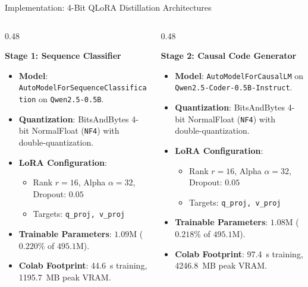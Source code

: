 \documentclass[aspectratio=169,10pt]{beamer}
\begin{document}
\begin{frame}{Implementation: 4-Bit QLoRA Distillation Architectures}
  \begin{columns}[T]
    \begin{column}{0.48\textwidth}
      \begin{block}{\textbf{Stage 1: Sequence Classifier}}
        \begin{itemize}\itemsep=1.5pt\scriptsize
          \item \textbf{Model}: \texttt{AutoModelForSequenceClassification} on \texttt{Qwen2.5-0.5B}.
          \item \textbf{Quantization}: BitsAndBytes 4-bit NormalFloat (\texttt{NF4}) with double-quantization.
          \item \textbf{LoRA Configuration}:
            \begin{itemize}\scriptsize
              \item Rank $r = 16$, Alpha $\alpha = 32$, Dropout: $0.05$
              \item Targets: \texttt{q\_proj, v\_proj}
            \end{itemize}
          \item \textbf{Trainable Parameters}: $1.09\text{M}$ ($0.220\%$ of $495.1\text{M}$).
          \item \textbf{Colab Footprint}: 44.6~s training, 1195.7~MB peak VRAM.
        \end{itemize}
      \end{block}
    \end{column}

    \begin{column}{0.48\textwidth}
      \begin{exampleblock}{\textbf{Stage 2: Causal Code Generator}}
        \begin{itemize}\itemsep=1.5pt\scriptsize
          \item \textbf{Model}: \texttt{AutoModelForCausalLM} on \texttt{Qwen2.5-Coder-0.5B-Instruct}.
          \item \textbf{Quantization}: BitsAndBytes 4-bit NormalFloat (\texttt{NF4}) with double-quantization.
          \item \textbf{LoRA Configuration}:
            \begin{itemize}\scriptsize
              \item Rank $r = 16$, Alpha $\alpha = 32$, Dropout: $0.05$
              \item Targets: \texttt{q\_proj, v\_proj}
            \end{itemize}
          \item \textbf{Trainable Parameters}: $1.08\text{M}$ ($0.218\%$ of $495.1\text{M}$).
          \item \textbf{Colab Footprint}: 97.4~s training, 4246.8~MB peak VRAM.
        \end{itemize}
      \end{exampleblock}
    \end{column}
  \end{columns}


\end{frame}
\end{document}
